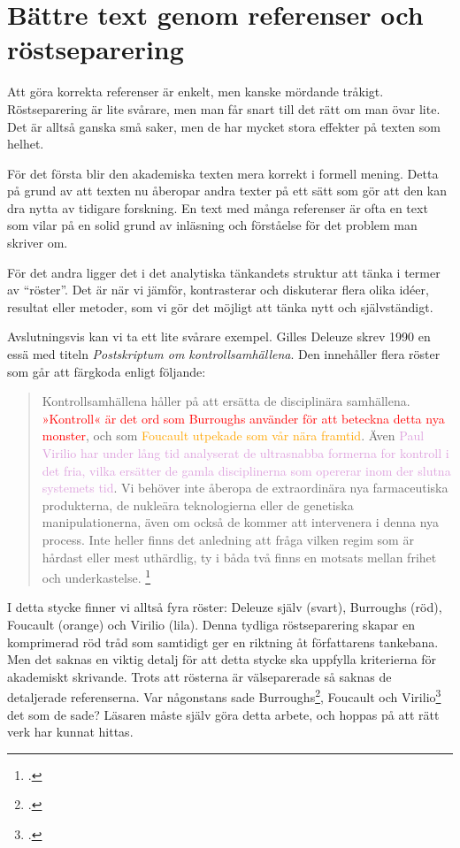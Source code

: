 \documentclass[11pt,a4paper,footinclude=true,headinclude=true]{report} %
\begin{document}
\section{Bättre text genom referenser och röstseparering}

Att göra korrekta referenser är enkelt, men kanske mördande tråkigt. Röstseparering är lite svårare, men man får snart till det rätt om man övar lite. Det är alltså ganska små saker, men de har mycket stora effekter på texten som helhet. 

För det första blir den akademiska texten mera korrekt i formell mening. Detta på grund av att texten nu åberopar andra texter på ett sätt som gör att den kan dra nytta av tidigare forskning. En text med många referenser är ofta en text som vilar på en solid grund av inläsning och förståelse för det problem man skriver om. 

För det andra ligger det i det analytiska tänkandets struktur att tänka i termer av ``röster''. Det är när vi jämför, kontrasterar och diskuterar flera olika idéer, resultat eller metoder, som vi gör det möjligt att tänka nytt och självständigt. 

Avslutningsvis kan vi ta ett lite svårare exempel. Gilles Deleuze skrev 1990 en essä med titeln \textit{Postskriptum om kontrollsamhällena}. Den innehåller flera röster som går att färgkoda enligt följande: 

\begin{quote}
Kontrollsamhällena håller på att ersätta de disciplinära samhällena. \textcolor{red}{»Kontroll« är det ord som Burroughs använder för att beteckna detta nya monster}, och som \textcolor{orange}{Foucault utpekade som vår nära framtid}. Även \textcolor{Plum}{Paul Virilio har under lång tid analyserat de ultrasnabba formerna for kontroll i det fria, vilka ersätter de gamla disciplinerna som opererar inom der slutna systemets tid}. Vi behöver inte åberopa de extraordinära nya farmaceutiska produkterna, de nukleära teknologierna eller de genetiska manipulationerna, även om också de kommer att intervenera i denna nya process. Inte heller finns det anledning att fråga vilken regim som är hårdast eller mest uthärdlig, ty i båda två finns en motsats mellan frihet och underkastelse. \footcite[s. 185-6]{deleuzeNomadologin1998}
\end{quote}

I detta stycke finner vi alltså fyra röster: Deleuze själv (svart), Burroughs (röd), Foucault (orange) och Virilio (lila). Denna tydliga röstseparering skapar en komprimerad röd tråd som samtidigt ger en riktning åt författarens tankebana. Men det saknas en viktig detalj för att detta stycke ska uppfylla kriterierna för akademiskt skrivande. Trots att rösterna är välseparerade så saknas de detaljerade referenserna. Var någonstans sade Burroughs\footcite{burroughsElectronicRevolution2001}, Foucault och Virilio\footcite{virilioSpeedPolitics2006} det som de sade? Läsaren måste själv göra detta arbete, och hoppas på att rätt verk har kunnat hittas. 
\end{document}
